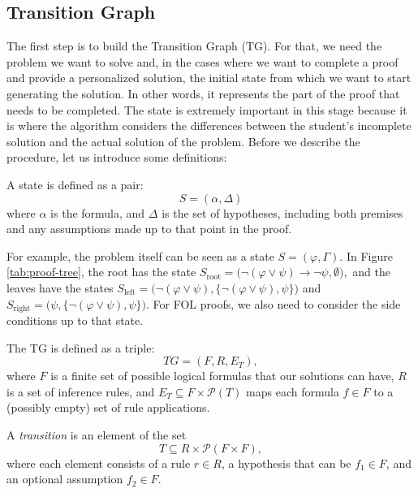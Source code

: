 \documentclass[runningheads]{llncs}
\begin{document}
\subsection{Transition Graph}
The first step is to build the Transition Graph (TG). For that, we need the problem we want to solve and, in the cases where we want to complete a proof and provide a personalized solution, the initial state from which we want to start generating the solution. In other words, it represents the part of the proof that needs to be completed. The state is extremely important in this stage because it is where the algorithm considers the differences between the student's incomplete solution and the actual solution of the problem. Before we describe the procedure, let us introduce some definitions:

\begin{definition}[State]
A state is defined as a pair:
\[
S = (\alpha, \Delta)
\]
where \(\alpha\) is the formula, and \(\Delta\) is the set of hypotheses, including both premises and any assumptions made up to that point in the proof.
\end{definition}

For example, the problem itself can be seen as a state \(S = (\varphi, \Gamma)\). In Figure \ref{tab:proof-tree}, the root has the state \(S_{\text{root}} = \big(\neg (\varphi \lor \psi) \to \neg \psi, \emptyset \big),\) and the leaves have the states 
\( S_{\text{left}} = \big(\neg (\varphi \lor \psi), \{\neg (\varphi \lor \psi), \psi\}\big)\) and \(S_{\text{right}} = \big(\psi, \{\neg (\varphi \lor \psi), \psi\}\big)\). For FOL proofs, we also need to consider the side conditions up to that state.

\begin{definition}
The TG is defined as a triple:
\[
TG = (F, R, E_T),
\]
where \( F \) is a finite set of possible logical formulas that our solutions can have, \( R \) is a set of inference rules, and \(E_T \subseteq F \times \mathcal{P}(T)\) maps each formula \( f \in F \) to a (possibly empty) set of rule applications.
\end{definition}

\begin{definition}
A \emph{transition} is an element of the set
\[
T \subseteq R \times \mathcal{P}(F \times F),
\]
where each element consists of a rule \( r \in R \), a hypothesis that can be \( f_1 \in F \), and an optional assumption \( f_2 \in F \).
\end{definition}
\end{document}
